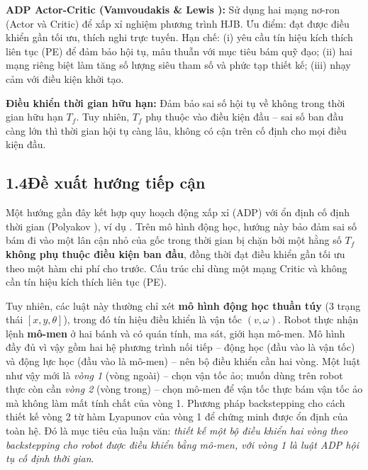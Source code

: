 \documentclass[12pt,a4paper]{article}
\begin{document}
\textbf{ADP Actor-Critic (Vamvoudakis \& Lewis \cite{Vamvoudakis2010}):} Sử dụng hai mạng nơ-ron (Actor và Critic) để xấp xỉ nghiệm phương trình HJB. Ưu điểm: đạt được điều khiển gần tối ưu, thích nghi trực tuyến. Hạn chế: (i) yêu cầu tín hiệu kích thích liên tục (PE) để đảm bảo hội tụ, mâu thuẫn với mục tiêu bám quỹ đạo; (ii) hai mạng riêng biệt làm tăng số lượng siêu tham số và phức tạp thiết kế; (iii) nhạy cảm với điều kiện khởi tạo.

\textbf{Điều khiển thời gian hữu hạn:} Đảm bảo sai số hội tụ về không trong thời gian hữu hạn $T_f$. Tuy nhiên, $T_f$ phụ thuộc vào điều kiện đầu -- sai số ban đầu càng lớn thì thời gian hội tụ càng lâu, không có cận trên cố định cho mọi điều kiện đầu.

\subsection*{1.4\quad Đề xuất hướng tiếp cận}

Một hướng gần đây kết hợp quy hoạch động xấp xỉ (ADP) với ổn định cố định thời gian (Polyakov \cite{Polyakov2012}), ví dụ \cite{Wang2025}. Trên mô hình động học, hướng này bảo đảm sai số bám đi vào một lân cận nhỏ của gốc trong thời gian bị chặn bởi một hằng số $T_f$ \textbf{không phụ thuộc điều kiện ban đầu}, đồng thời đạt điều khiển gần tối ưu theo một hàm chi phí cho trước. Cấu trúc chỉ dùng một mạng Critic và không cần tín hiệu kích thích liên tục (PE).

Tuy nhiên, các luật này thường chỉ xét \textbf{mô hình động học thuần túy} (3 trạng thái $[x, y, \theta]$), trong đó tín hiệu điều khiển là vận tốc $(v, \omega)$. Robot thực nhận lệnh \textbf{mô-men} ở hai bánh và có quán tính, ma sát, giới hạn mô-men. Mô hình đầy đủ vì vậy gồm hai hệ phương trình nối tiếp -- động học (đầu vào là vận tốc) và động lực học (đầu vào là mô-men) -- nên bộ điều khiển cần hai vòng. Một luật như vậy mới là \textit{vòng 1} (vòng ngoài) -- chọn vận tốc ảo; muốn dùng trên robot thực còn cần \textit{vòng 2} (vòng trong) -- chọn mô-men để vận tốc thực bám vận tốc ảo mà không làm mất tính chất của vòng 1. Phương pháp backstepping \cite{Krstic1995} cho cách thiết kế vòng 2 từ hàm Lyapunov của vòng 1 để chứng minh được ổn định của toàn hệ. Đó là mục tiêu của luận văn: \textit{thiết kế một bộ điều khiển hai vòng theo backstepping cho robot được điều khiển bằng mô-men, với vòng 1 là luật ADP hội tụ cố định thời gian}.
\end{document}
